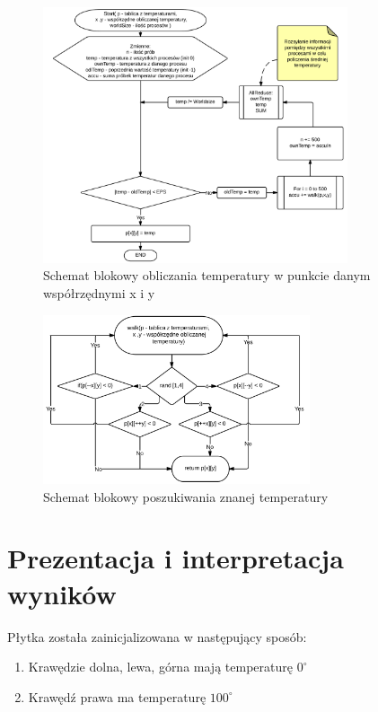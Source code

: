 \documentclass[11pt,a4paper]{article}
\begin{document}
\begin{figure}[H]
\begin{center}
\includegraphics[width=0.8\textwidth]{schemat1.png}
\caption{Schemat blokowy obliczania temperatury w punkcie danym współrzędnymi x i y}
\end{center}
\end{figure}

\begin{figure}[H]
\begin{center}
\includegraphics[width=0.7\textwidth]{schemat2.png}
\caption{Schemat blokowy poszukiwania znanej temperatury}
\end{center}
\end{figure}



\section{Prezentacja i interpretacja wyników}

Płytka została zainicjalizowana w następujący sposób:
\begin{enumerate}
	\item Krawędzie dolna, lewa, górna mają temperaturę $0^{\circ}$
	\item Krawędź prawa ma temperaturę $100^{\circ}$
\end{enumerate}
\end{document}
